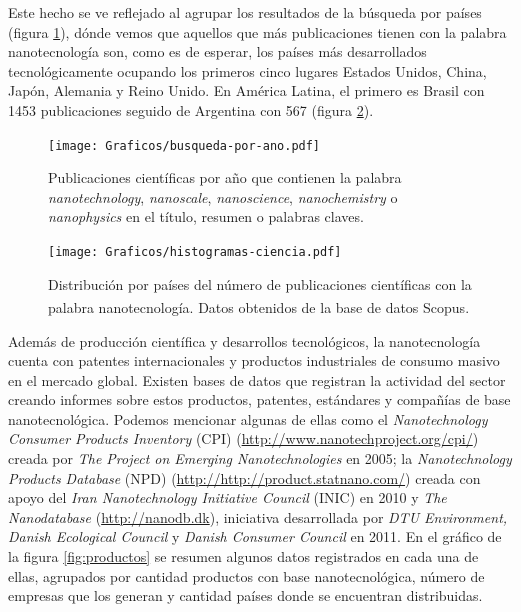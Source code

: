 	 \pagebreak Este hecho se ve reflejado al agrupar los resultados de la búsqueda por países (figura \ref{fig:publicaciones-ano}), dónde vemos que aquellos que más publicaciones tienen con la palabra nanotecnología son, como es de esperar, los países más desarrollados tecnológicamente ocupando los primeros cinco lugares Estados Unidos, China, Japón, Alemania y Reino Unido. En América Latina, el primero es Brasil con 1453 publicaciones seguido de Argentina con 567 (figura \ref{fig:paises}).


 			\begin{figure}[h!]
 			\begin{center}
 			\hspace{0.3cm}\texttt{[image: Graficos/busqueda-por-ano.pdf]}
 			\vspace*{-0.6cm}
 			\caption[Publicaciones por año en nanotecnología]{Publicaciones científicas por año que contienen la palabra \textit{nanotechnology}, \textit{nanoscale}, \textit{nanoscience}, \textit{nanochemistry} o \textit{nanophysics} en el título, resumen o palabras claves.}
 			\label{fig:publicaciones-ano}
 			\vspace*{-0.2cm} 		    
 			\end{center}
 		    \end{figure}

			\begin{figure}[b!]
 				\begin{center}
 				\texttt{[image: Graficos/histogramas-ciencia.pdf]}
 				\vspace*{-0.4cm}
 				\caption[Nanotecnología por países]{Distribución por países del número de publicaciones científicas con la palabra nanotecnología. Datos obtenidos de la base de datos Scopus\textsuperscript\textregistered.}
 				\label{fig:paises}
 		    	\end{center}
 		    	\end{figure}

	 Además de producción científica y desarrollos tecnológicos, la nanotecnología cuenta con patentes internacionales y productos industriales de consumo masivo en el mercado global. Existen bases de datos que registran la actividad del sector creando informes sobre estos productos, patentes, estándares y compañías de base nanotecnológica. Podemos mencionar algunas de ellas como el \textit{Nanotechnology Consumer Products Inventory} (CPI) (\url{http://www.nanotechproject.org/cpi/}) creada por \textit{The Project on Emerging Nanotechnologies} en 2005\cite{Vance2015}; la \textit{Nanotechnology Products Database} (NPD) (\url{http://http://product.statnano.com/}) creada con apoyo del \textit{Iran Nanotechnology Initiative Council} (INIC) en 2010 y \textit{The Nanodatabase} (\url{http://nanodb.dk}), iniciativa desarrollada por \textit{DTU Environment, Danish Ecological Council} y \textit{Danish Consumer Council} en 2011. En el gráfico de la figura \ref{fig:productos} se resumen algunos datos registrados en cada una de ellas, agrupados por cantidad productos con base nanotecnológica, número de empresas que los generan y cantidad países donde se encuentran distribuidas.

